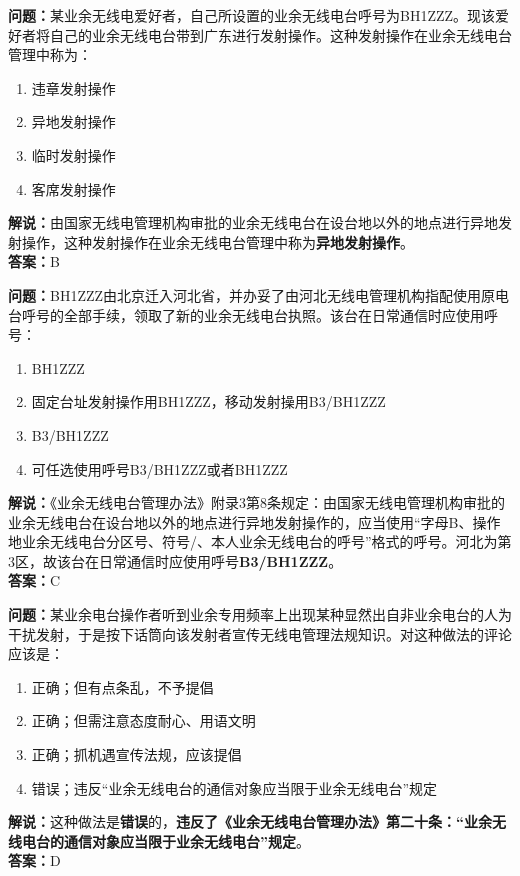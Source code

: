 \bigskip


\noindent\textbf{问题：}某业余无线电爱好者，自己所设置的业余无线电台呼号为BH1ZZZ。现该爱好者将自己的业余无线电台带到广东进行发射操作。这种发射操作在业余无线电台管理中称为：
\begin{enumerate}[label=\Alph*), leftmargin=3em]
	\item 违章发射操作
	\item 异地发射操作
	\item 临时发射操作
	\item 客席发射操作
\end{enumerate}
\noindent\textbf{解说：}由国家无线电管理机构审批的业余无线电台在设台地以外的地点进行异地发射操作，这种发射操作在业余无线电台管理中称为\textbf{异地发射操作}。\\\noindent\textbf{答案：}B





\bigskip


\noindent\textbf{问题：}BH1ZZZ由北京迁入河北省，并办妥了由河北无线电管理机构指配使用原电台呼号的全部手续，领取了新的业余无线电台执照。该台在日常通信时应使用呼号：
\begin{enumerate}[label=\Alph*), leftmargin=3em]
	\item BH1ZZZ
	\item 固定台址发射操作用BH1ZZZ，移动发射操用B3/BH1ZZZ
	\item B3/BH1ZZZ
	\item 可任选使用呼号B3/BH1ZZZ或者BH1ZZZ
\end{enumerate}
\noindent\textbf{解说：}《业余无线电台管理办法》附录3第8条规定：由国家无线电管理机构审批的业余无线电台在设台地以外的地点进行异地发射操作的，应当使用“字母B、操作地业余无线电台分区号、符号/、本人业余无线电台的呼号”格式的呼号。河北为第3区，故该台在日常通信时应使用呼号\textbf{B3/BH1ZZZ}。\\\noindent\textbf{答案：}C



\bigskip


\noindent\textbf{问题：}某业余电台操作者听到业余专用频率上出现某种显然出自非业余电台的人为干扰发射，于是按下话筒向该发射者宣传无线电管理法规知识。对这种做法的评论应该是：
\begin{enumerate}[label=\Alph*), leftmargin=3em]
	\item 正确；但有点条乱，不予提倡
	\item 正确；但需注意态度耐心、用语文明
	\item 正确；抓机遇宣传法规，应该提倡
	\item 错误；违反“业余无线电台的通信对象应当限于业余无线电台”规定
\end{enumerate}
\noindent\textbf{解说：}这种做法是\textbf{错误}的，\textbf{违反了《业余无线电台管理办法》第二十条：“业余无线电台的通信对象应当限于业余无线电台”规定}。\\\noindent\textbf{答案：}D



